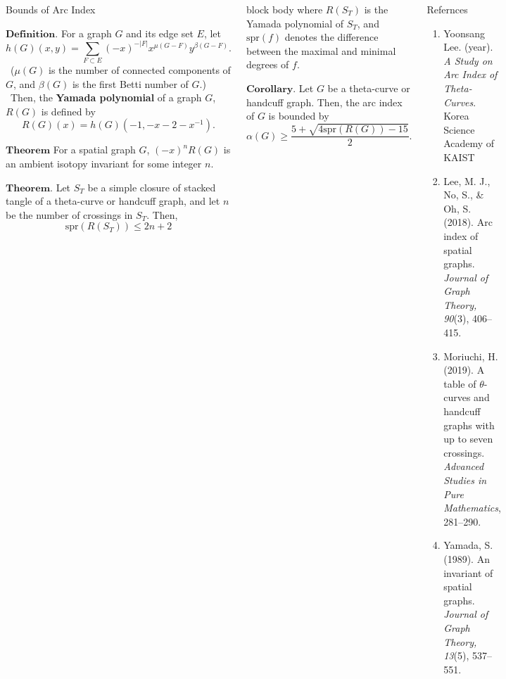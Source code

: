 \documentclass[final]{beamer}
\begin{document}
\begin{frame}[t]
\begin{columns}[t]
  \begin{block}{Bounds of Arc Index}

    $\mathbf{Definition.}$ For a graph $G$ and its edge set $E$, let
    \[ h(G)(x, y) = \sum_{F \subset E} (-x)^{-|F|} x^{\mu(G-F)} y^{\beta(G-F)}. \]
    \ ($\mu(G)$ is the number of connected components of $G$, and $\beta(G)$ is the first Betti number of $G$.) \\
    \ Then, the \textbf{Yamada polynomial} of a graph $G$, $R(G)$ is defined by
    \[ R(G)(x) = h(G)(-1, -x-2-x^{-1}). \]

    \vspace{1em}

    $\mathbf{Theorem}$ For a spatial graph $G$, $(-x)^n R(G)$ is an ambient isotopy invariant for some integer $n$.

    \vspace{1em}
    
    $\mathbf{Theorem.}$ Let $S_T$ be a simple closure of stacked tangle of a theta-curve or handcuff graph, and let $n$ be the number of crossings in $S_T$. Then,
     \[ \mathrm{spr}(R(S_T)) \leq 2n+2 \]
  \end{block}

  \begin{beamercolorbox}[rounded=true, shadow=false, wd=\textwidth]{block body}
    where $R(S_T)$ is the Yamada polynomial of $S_T$, and $\mathrm{spr}(f)$ denotes the difference between the maximal and minimal degrees of $f$. \\

    \vspace{1em}

    $\mathbf{Corollary.}$  Let $G$ be a theta-curve or handcuff graph. Then, the arc index of $G$ is bounded by
      \[ \alpha(G) \geq \frac{5 + \sqrt{4 \mathrm{spr}(R(G)) - 15}}{2}. \]
  \end{beamercolorbox}

  \begin{block}{Refernces}
    \begin{enumerate}
      \item Yoonsang Lee. (year). \textit{A Study on Arc Index of Theta-Curves}. Korea Science Academy of KAIST
      \item Lee, M. J., No, S., & Oh, S. (2018). Arc index of spatial graphs. \textit{Journal of Graph Theory, 90}(3), 406–415.
      \item Moriuchi, H. (2019). A table of $\theta$-curves and handcuff graphs with up to seven crossings. \textit{Advanced Studies in Pure Mathematics}, 281–290.
      \item Yamada, S. (1989). An invariant of spatial graphs. \textit{Journal of Graph Theory, 13}(5), 537–551.
      
    \end{enumerate}
  \end{block}
\end{columns}



\end{frame}
\end{document}
